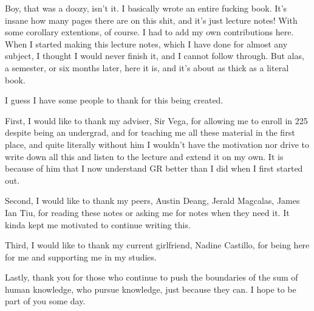 
Boy, that was a doozy, isn't it. I basically wrote 
an entire fucking book. It's insane how many pages there
are on this shit, and it's just lecture notes! With 
some corollary extentions, of course. I had to add my own 
contributions here. When 
I started making this lecture notes, which I have done for almost 
any subject, I thought I would never finish it, and I cannot
follow through. But alas, a semester, or six months later, here it is, and it's about as
thick as a literal book. 

I guess I have some people to thank for this being created.

First, I would like to thank my adviser, Sir Vega, for allowing
me to enroll in 225 despite being an undergrad, and for teaching me all these material
in the first place, and quite literally without him I wouldn't have 
the motivation nor drive to write down all this and listen to the lecture 
and extend it on my own. It is because of him that I now understand GR better
than I did when I first started out.

Second, I would like to thank my peers, Austin Deang, Jerald Magcalas, James Ian Tiu,
for reading these notes or asking me for notes when they need it. It kinda kept
me motivated to continue writing this.

Third, I would like to thank my current girlfriend, Nadine Castillo, for 
being here for me and supporting me in my studies.

Lastly, thank you for those who continue to push the boundaries of the sum of human knowledge,
who pursue knowledge, just because they can. 
I hope to be part of you some day.
